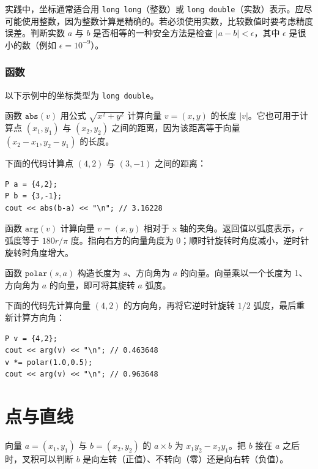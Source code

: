 实践中，坐标通常适合用 \texttt{long long}（整数）或 \texttt{long double}（实数）表示。应尽可能使用整数，因为整数计算是精确的。若必须使用实数，比较数值时要考虑精度误差。判断实数 $a$ 与 $b$ 是否相等的一种安全方法是检查 $|a-b|<\epsilon$，其中 $\epsilon$ 是很小的数（例如 $\epsilon=10^{-9}$）。

\subsubsection*{函数}

以下示例中的坐标类型为 \texttt{long double}。

函数 $\texttt{abs}(v)$ 用公式 $\sqrt{x^2+y^2}$ 计算向量 $v=(x,y)$ 的长度 $|v|$。它也可用于计算点 $(x_1,y_1)$ 与 $(x_2,y_2)$ 之间的距离，因为该距离等于向量 $(x_2-x_1,y_2-y_1)$ 的长度。

下面的代码计算点 $(4,2)$ 与 $(3,-1)$ 之间的距离：
\begin{lstlisting}
P a = {4,2};
P b = {3,-1};
cout << abs(b-a) << "\n"; // 3.16228
\end{lstlisting}

函数 $\texttt{arg}(v)$ 计算向量 $v=(x,y)$ 相对于 x 轴的夹角。返回值以弧度表示，$r$ 弧度等于 $180 r/\pi$ 度。指向右方的向量角度为 0；顺时针旋转时角度减小，逆时针旋转时角度增大。

函数 $\texttt{polar}(s,a)$ 构造长度为 $s$、方向角为 $a$ 的向量。向量乘以一个长度为 1、方向角为 $a$ 的向量，即可将其旋转 $a$ 弧度。

下面的代码先计算向量 $(4,2)$ 的方向角，再将它逆时针旋转 $1/2$ 弧度，最后重新计算方向角：

\begin{lstlisting}
P v = {4,2};
cout << arg(v) << "\n"; // 0.463648
v *= polar(1.0,0.5);
cout << arg(v) << "\n"; // 0.963648
\end{lstlisting}

\section{点与直线}


向量 $a=(x_1,y_1)$ 与 $b=(x_2,y_2)$ 的 $a \times b$ 为 $x_1 y_2 - x_2 y_1$。把 $b$ 接在 $a$ 之后时，叉积可以判断 $b$ 是向左转（正值）、不转向（零）还是向右转（负值）。

